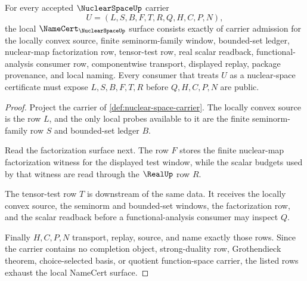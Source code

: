 \begin{theorem}
\label{thm:nuclear-space-namecert-obligations}
For every accepted $\NuclearSpaceUp$ carrier
$$
U=(L,S,B,F,T,R,Q,H,C,P,N),
$$
the local $\NameCert_{\NuclearSpaceUp}$ surface consists exactly of carrier admission for the locally convex source, finite seminorm-family window, bounded-set ledger, nuclear-map factorization row, tensor-test row, real scalar readback, functional-analysis consumer row, componentwise transport, displayed replay, package provenance, and local naming. Every consumer that treats $U$ as a nuclear-space certificate must expose $L,S,B,F,T,R$ before $Q,H,C,P,N$ are public.
\end{theorem}
\begin{proof}
Project the carrier of \autoref{def:nuclear-space-carrier}. The locally convex source is the row $L$, and the only local probes available to it are the finite seminorm-family row $S$ and bounded-set ledger $B$.

Read the factorization surface next. The row $F$ stores the finite nuclear-map factorization witness for the displayed test window, while the scalar budgets used by that witness are read through the $\RealUp$ row $R$.

The tensor-test row $T$ is downstream of the same data. It receives the locally convex source, the seminorm and bounded-set windows, the factorization row, and the scalar readback before a functional-analysis consumer may inspect $Q$.

Finally $H,C,P,N$ transport, replay, source, and name exactly those rows. Since the carrier contains no completion object, strong-duality row, Grothendieck theorem, choice-selected basis, or quotient function-space carrier, the listed rows exhaust the local NameCert surface.
\end{proof}

